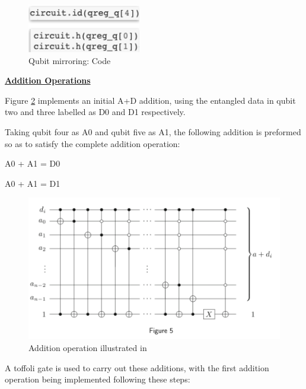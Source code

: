 \begin{figure}[H]
      \centering
      \includegraphics[scale=0.6]{background/SUp1COde.png}
      \caption{Qubit mirroring: Code}
      \label{QSUPCo}
\end{figure}




\vspace{0.5cm}
\textbf{\underline{Addition Operations}}
\vspace{0.1cm}


Figure \ref{QAIns} implements an initial A+D addition,
using the entangled data in qubit two and three labelled as D0 and D1 respectively.


Taking qubit four as A0 and qubit five as A1, the following addition is preformed so as to satisfy the complete addition operation:

	\hspace{0.35\textwidth}	A0 + A1 = D0
	
	\hspace{0.35\textwidth}	A0 + A1 = D1
	
\begin{figure}[H]
      \centering
      \includegraphics[scale=0.65]{background/AdIns.png}
      \caption{Addition operation illustrated in \citep{Kaye}}
      \label{QAIns}
\end{figure}

A toffoli gate is used to carry out these additions, with the first addition operation being implemented following these steps:

